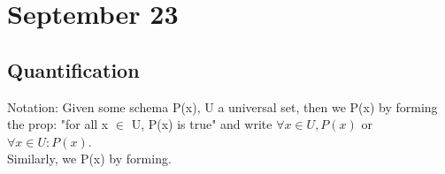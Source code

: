\section{September 23}
\subsection{Quantification}
Notation: Given some schema P(x), U a universal set, then we  P(x) by forming the prop: "for all x $\in$ U, P(x) is true" and write $\forall x \in U, P(x)$ or $\forall x \in U: P(x)$.
\\
Similarly, we  P(x) by forming.
